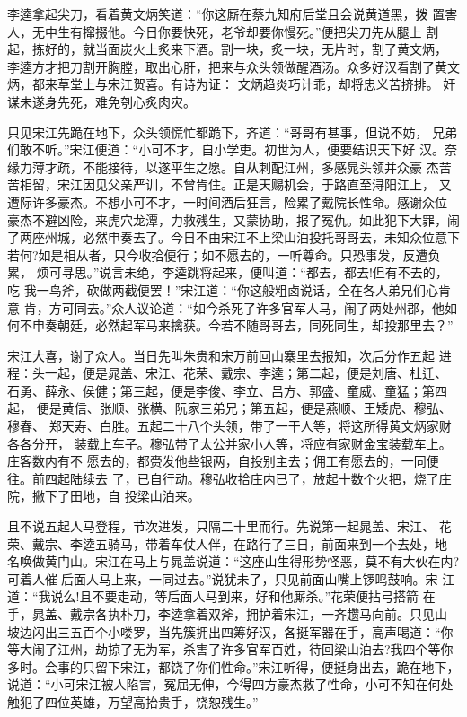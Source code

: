 李逵拿起尖刀，看着黄文炳笑道：“你这厮在蔡九知府后堂且会说黄道黑，拨
置害人，无中生有撺掇他。今日你要快死，老爷却要你慢死。”便把尖刀先从腿上
割起，拣好的，就当面炭火上炙来下酒。割一块，炙一块，无片时，割了黄文炳，
李逵方才把刀割开胸膛，取出心肝，把来与众头领做醒酒汤。众多好汉看割了黄文
炳，都来草堂上与宋江贺喜。有诗为证：
文炳趋炎巧计乖，却将忠义苦挤排。
奸谋未遂身先死，难免刳心炙肉灾。

只见宋江先跪在地下，众头领慌忙都跪下，齐道：“哥哥有甚事，但说不妨，
兄弟们敢不听。”宋江便道：“小可不才，自小学吏。初世为人，便要结识天下好
汉。奈缘力薄才疏，不能接待，以遂平生之愿。自从刺配江州，多感晁头领并众豪
杰苦苦相留，宋江因见父亲严训，不曾肯住。正是天赐机会，于路直至浔阳江上，
又遭际许多豪杰。不想小可不才，一时间酒后狂言，险累了戴院长性命。感谢众位
豪杰不避凶险，来虎穴龙潭，力救残生，又蒙协助，报了冤仇。如此犯下大罪，闹
了两座州城，必然申奏去了。今日不由宋江不上梁山泊投托哥哥去，未知众位意下
若何?如是相从者，只今收拾便行；如不愿去的，一听尊命。只恐事发，反遭负累，
烦可寻思。”说言未绝，李逵跳将起来，便叫道：“都去，都去!但有不去的，吃
我一鸟斧，砍做两截便罢！”宋江道：“你这般粗卤说话，全在各人弟兄们心肯意
肯，方可同去。”众人议论道：“如今杀死了许多官军人马，闹了两处州郡，他如
何不申奏朝廷，必然起军马来擒获。今若不随哥哥去，同死同生，却投那里去？”

宋江大喜，谢了众人。当日先叫朱贵和宋万前回山寨里去报知，次后分作五起
进程：头一起，便是晁盖、宋江、花荣、戴宗、李逵；第二起，便是刘唐、杜迁、
石勇、薛永、侯健；第三起，便是李俊、李立、吕方、郭盛、童威、童猛；第四起，
便是黄信、张顺、张横、阮家三弟兄；第五起，便是燕顺、王矮虎、穆弘、穆春、
郑天寿、白胜。五起二十八个头领，带了一干人等，将这所得黄文炳家财各各分开，
装载上车子。穆弘带了太公并家小人等，将应有家财金宝装载车上。庄客数内有不
愿去的，都赍发他些银两，自投别主去；佣工有愿去的，一同便往。前四起陆续去
了，已自行动。穆弘收拾庄内已了，放起十数个火把，烧了庄院，撇下了田地，自
投梁山泊来。

且不说五起人马登程，节次进发，只隔二十里而行。先说第一起晁盖、宋江、
花荣、戴宗、李逵五骑马，带着车仗人伴，在路行了三日，前面来到一个去处，地
名唤做黄门山。宋江在马上与晁盖说道：“这座山生得形势怪恶，莫不有大伙在内?
可着人催后面人马上来，一同过去。”说犹未了，只见前面山嘴上锣鸣鼓响。宋
江道：“我说么!且不要走动，等后面人马到来，好和他厮杀。”花荣便拈弓搭箭
在手，晁盖、戴宗各执朴刀，李逵拿着双斧，拥护着宋江，一齐趱马向前。只见山
坡边闪出三五百个小喽罗，当先簇拥出四筹好汉，各挺军器在手，高声喝道：“你
等大闹了江州，劫掠了无为军，杀害了许多官军百姓，待回梁山泊去?我四个等你
多时。会事的只留下宋江，都饶了你们性命。”宋江听得，便挺身出去，跪在地下，
说道：“小可宋江被人陷害，冤屈无伸，今得四方豪杰救了性命，小可不知在何处
触犯了四位英雄，万望高抬贵手，饶恕残生。”

